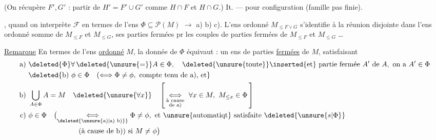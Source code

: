 
(On récupère $F',G'$ : partir de $H'=F'\cup G'$ comme $H\cap F$ et $H\cap G$.) It. --- pour    configuration (famille pas  finie). 

  , quand on interprète $\mathcal F$ en termes de l'ens $\Phi\subseteq\mathcal P(M)$  $\to$ a) b) c). L'ens ordonné $M_{\leq F\vee G}$ s'identifie à la réunion disjointe dans l'ens ordonné somme de $M_{\leq F}$ et $M_{\leq G}$,  ses parties fermées    pr les couples de parties fermées de $M_{\leq F}$ et $M_{\leq G}$ \ldots

\uline{Remarque}
En termes de l'ens \uline{ordonné} $M$, la donnée de $\Phi$ équivaut : un ens de parties \uline{fermées} de $M$, satisfaisant
\[
\begin{aligned}
\text{a) }&\deleted{\Phi}\forall\,\deleted{\unsure{=}}A\in\Phi,\quad
 \deleted{\text{\unsure{toute}}}\inserted{\text{et}}\ \text{partie fermée }A'\text{ de }A,\ \text{on a }A'\in\Phi\\
&\deleted{\text{b) }\phi\in\Phi\quad
 (\Longleftrightarrow\Phi\ne\phi,\ \text{compte tenu de a), et}}\\
\text{b) }&\bigcup_{A\in\Phi} A=M\quad\deleted{\unsure{\forall x}}\quad
 \left[\,\underset{\substack{\text{à cause}\\\text{de a)}}}{\Longleftrightarrow}\
 \forall x\in M,\ M_{\leq x}\in\Phi\,\right]\\
\text{c) }&\phi\in\Phi\quad
 \bigl(\underset{\deleted{\unsure{\text{a)}|\text{a) b)}}}}{\Longleftrightarrow}
 \Phi\ne\phi,\ \text{et \unsure{automatiqt} satisfaite}\ \deleted{\unsure{s|\Phi}}\\
 &\hspace{7em}\text{(à cause de b)) si }M\ne\phi\bigr)
\end{aligned}
\]

